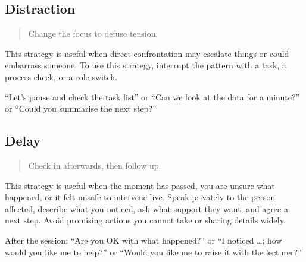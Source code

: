 \documentclass[
  a4paper,
  DIV=11,
  numbers=noendperiod,
  oneside]{scrreprt}
\begin{document}
\subsection{Distraction}\label{distraction}

\begin{quote}
Change the focus to defuse tension.
\end{quote}

This strategy is useful when direct confrontation may escalate things or
could embarrass someone. To use this strategy, interrupt the pattern
with a task, a process check, or a role switch.

\begin{tcolorbox}[enhanced jigsaw, opacitybacktitle=0.6, colframe=quarto-callout-note-color-frame, bottomrule=.15mm, coltitle=black, colback=white, title=\textcolor{quarto-callout-note-color}{\faInfo}\hspace{0.5em}{Example phrases}, breakable, toptitle=1mm, arc=.35mm, left=2mm, opacityback=0, rightrule=.15mm, bottomtitle=1mm, colbacktitle=quarto-callout-note-color!10!white, toprule=.15mm, leftrule=.75mm, titlerule=0mm]

``Let's pause and check the task list'' or ``Can we look at the data for
a minute?'' or ``Could you summarise the next step?''

\end{tcolorbox}

\subsection{Delay}\label{delay}

\begin{quote}
Check in afterwards, then follow up.
\end{quote}

This strategy is useful when the moment has passed, you are unsure what
happened, or it felt unsafe to intervene live. Speak privately to the
person affected, describe what you noticed, ask what support they want,
and agree a next step. Avoid promising actions you cannot take or
sharing details widely.

\begin{tcolorbox}[enhanced jigsaw, opacitybacktitle=0.6, colframe=quarto-callout-note-color-frame, bottomrule=.15mm, coltitle=black, colback=white, title=\textcolor{quarto-callout-note-color}{\faInfo}\hspace{0.5em}{Example phrases}, breakable, toptitle=1mm, arc=.35mm, left=2mm, opacityback=0, rightrule=.15mm, bottomtitle=1mm, colbacktitle=quarto-callout-note-color!10!white, toprule=.15mm, leftrule=.75mm, titlerule=0mm]

After the session: ``Are you OK with what happened?'' or ``I noticed
\ldots; how would you like me to help?'' or ``Would you like me to raise
it with the lecturer?''

\end{tcolorbox}
\end{document}
